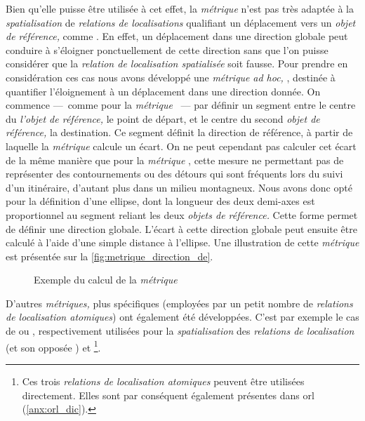 Bien qu'elle puisse être utilisée à cet effet, la \emph{métrique}
 n'est pas très adaptée à la
\emph{spatialisation} de \emph{relations de localisations} qualifiant
un déplacement vers un \emph{objet de référence,} comme
. En effet, un déplacement dans une
direction globale peut conduire à s'éloigner ponctuellement de cette
direction sans que l'on puisse considérer que la \emph{relation de
  localisation spatialisée} soit fausse. Pour prendre en considération
ces cas nous avons développé une \emph{métrique} \emph{ad hoc,}
, destinée à quantifier l'éloignement à un
déplacement dans une direction donnée. On commence ---~comme pour la
\emph{métrique} ~--- par définir un segment
entre le centre du \emph{l'objet de référence,} le point de départ, et
le centre du second \emph{objet de référence,} la destination. Ce
segment définit la direction de référence, à partir de laquelle la
\emph{métrique} calcule un écart. On ne peut cependant pas calculer
cet écart de la même manière que pour la \emph{métrique}
, cette mesure ne permettant pas de représenter
des contournements ou des détours qui sont fréquents lors du suivi
d'un itinéraire, d'autant plus dans un milieu montagneux. Nous avons
donc opté pour la définition d'une ellipse, dont la longueur des deux
demi-axes est proportionnel au segment reliant les deux \emph{objets
  de référence.} Cette forme permet de définir une direction
globale. L'écart à cette direction globale peut ensuite être calculé à
l'aide d'une simple distance à l'ellipse. Une illustration de cette
\emph{métrique} est présentée sur la
\autoref{fig:metrique_direction_de}.

\begin{figure}
  \centering
  
  \caption{Exemple du calcul de la \emph{métrique}
    \protect{}}
  \label{fig:metrique_direction_de}
\end{figure}

D'autres \emph{métriques,} plus spécifiques (\ie employées par un
petit nombre de \emph{relations de localisation atomiques}) ont
également été développées. C'est par exemple le cas de
 ou , respectivement
utilisées pour la \emph{spatialisation} des \emph{relations de
  localisation}  (et son opposée
) et 
\footnote{Ces trois \emph{relations de localisation atomiques} peuvent
  être utilisées directement. Elles sont par conséquent également
  présentes dans \ac{orl} (\autoref{anx:orl_dic}).}.

